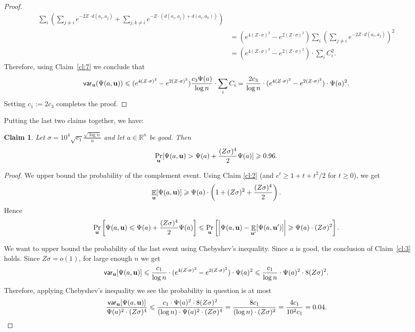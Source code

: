 \documentclass[10pt,a4paper]{article}
\newtheorem{claim}[thm]{Claim}
\newcommand\E{\mathop{\mathbb{E}}}
\newcommand\card[1]{\left| {#1} \right|}
\renewcommand\geq{\geqslant}
\renewcommand\leq{\leqslant}
\newcommand{\si}{\sigma}
\begin{document}
\begin{proof}
\begin{align*}
 \sum_{i}
 \left(\sum_{j\neq i} e^{-2Z\cdot d(a_i,a_j)} + \sum_{j,k\neq i}
e^{-Z\cdot (d(a_i,a_j)+d(a_i,a_k))}\right)\\
&=(e^{4 (Z\cdot \si)^2}-e^{2 (Z\cdot \si)^2})\sum\limits_{i}\left(\sum_{j\neq i} e^{-2Z\cdot d(a_i,a_j)}\right)^2\\
&=  (e^{4 (Z\cdot \si)^2}-e^{2 (Z\cdot \si)^2}) \cdot \sum_i C_i^2.
\end{align*}
Therefore, using Claim~\ref{cl:7} we conclude that
\begin{multline*}
{\sf var}_{\bf u} ( \Psi(a,{\bf u}))
\leq
( e^{4 (Z\cdot \si)^2}-e^{2 (Z\cdot \si)^2}) \frac{c_3\Psi(a)}{\log n}\cdot \sum_i C_i =
\frac{2 c_3}{\log n}\cdot
( e^{4 (Z\cdot \si)^2}-e^{2 (Z\cdot \si)^2}) \cdot \Psi(a)^2.
\end{multline*}
Setting $c_1:=2c_3$ completes the proof.
\end{proof}

Putting the last two claims together, we have:

\begin{claim}
	\label{cl:4}
Let $\sigma = 10^4\sqrt{c_1} \frac{\sqrt{\log n}}{n}$ and let $a\in\mathbb{R}^n$ be good.
Then
\[
\Pr_{{\bf u}}[\Psi(a,{\bf u})>\Psi(a)+\frac{(Z\si)^4}{2}\Psi(a)]\geq 0.96.
\]
\end{claim}
\begin{proof}
	We upper bound the probability of the complement event. Using Claim \ref{cl:2} (and $e^{t}\geq 1+t+t^2/2$ for $t\geq 0$), we get
	\[
	\E_{\bf u}[\Psi(a,{\bf u})]\geq \Psi(a)\cdot \left(1+(Z \si)^2+\frac{(Z\si)^4}{2}\right).
	\]
	Hence
	\[
	\Pr_{{\bf u}}\left[\Psi(a,{\bf u})\leq \Psi(a)+\frac{(Z\si)^4}{2}\Psi(a)\right] \leq \Pr_{{\bf u}}\left[\card{\Psi(a,{\bf u})- \E_{{\bf u'}}[\Psi(a,{\bf u'})]}\geq
\Psi(a)\cdot  (Z \si)^2\right].
	\]

    We want to upper bound the probability of the last event using Chebyshev's inequality.
    Since $a$ is good, the conclusion of Claim~\ref{cl:3} holds.
    Since $Z \si =o(1)$, for large enough $n$ we get
	\[
	{\sf var}_{\bf u} [\Psi(a,{\bf u})]
    \leq
    \frac{c_1}{\log n} \cdot( e^{4(Z \cdot \si)^2}
	-e^{2(Z \cdot \si)^2})\cdot \Psi(a)^2
    \leq \frac{c_1}{\log n} \cdot \Psi(a)^2\cdot 8(Z \si)^2.
	\]
    Therefore, applying Chebyshev's inequality we see the probability in question is at most
    \[
	\frac{{\sf var}_{\bf u} [\Psi(a,{\bf u})]}{\Psi(a)^2 \cdot  (Z \si)^4} \leq
	\frac{c_1 \cdot \Psi(a)^2 \cdot 8 (Z \si)^2}{(\log n)\cdot \Psi(a)^2 \cdot  (Z \si)^4 }
    = \frac{8c_1}{(\log n)\cdot (Z\sigma)^2 } = \frac{4 c_1}{10^2 c_1} = 0.04.\qedhere
    \]
\end{proof}
\end{document}
